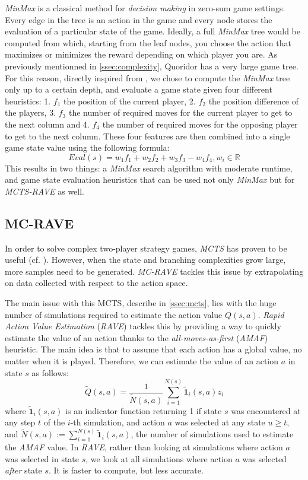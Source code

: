\documentclass[journal, a4paper]{IEEEtran}
\begin{document}
\textit{MinMax} is a classical method for \textit{decision making} in zero-sum game settings. Every edge in the tree is an action in the game and every node stores the evaluation of a particular state of the game.
Ideally, a full \textit{MinMax} tree would be computed from which, starting from the leaf nodes, you choose the action that maximizes or minimizes the reward depending on which player you are. As previously mentionned in \ref{ssec:complexity}, Quoridor has a very large game tree. For this reason, directly inspired from \cite{heuristic-agent}, we chose to compute the \textit{MinMax} tree only up to a certain depth, and evaluate a game state given four different heuristics: 1. $f_1$ the position of the current player, 2. $f_2$ the position difference of the players, 3. $f_3$ the number of required moves for the current player to get to the next column and 4. $f_4$ the number of required moves for the opposing player to get to the next column. These four features are then combined into a single game state value using the following formula:  
$$Eval(s) = w_1 f_1 + w_2 f_2 + w_3 f_3 - w_4 f_4,   w_i \in \mathbb{R}$$
This results in two things: a \textit{MinMax} search algorithm with moderate runtime, and game state evaluation heuristics that can be used not only \textit{MinMax} but for \textit{MCTS-RAVE} as well.

\subsection{MC-RAVE}
\label{ssec:mc-rave}
In order to solve complex two-player strategy games, \textit{MCTS} has proven to be useful (cf. \cite{mcts-review}). However, when the state and branching complexities grow large, more samples need to be generated. \textit{MC-RAVE}\cite{mc-rave} tackles this issue by extrapolating on data collected with respect to the action space.

The main issue with this MCTS, describe in \ref{ssec:mcts}, lies with the huge number of simulations required to estimate the action value $Q(s,a)$. \textit{Rapid Action Value Estimation} (\textit{RAVE}) \cite{mc-rave} tackles this by providing a way to quickly estimate the value of an action thanks to the \textit{all-moves-as-first} (\textit{AMAF}) heuristic. The main idea is that to assume that each action has a global value, no matter when it is played. Therefore, we can estimate the value of an action $a$ in state $s$ as follows:
$$\tilde Q(s,a) = \frac{1}{\tilde N(s,a)} \sum_{i=1}^{N(s)} \mathbf{\tilde 1}_{i}(s,a)z_i$$
where $\mathbf{\tilde 1}_{i}(s,a)$ is an indicator function returning 1 if state $s$ was encountered at any step $t$ of the $i$-th simulation, and action $a$ was selected at any state $u\geq t$, and $\tilde N(s,a):=\sum_{i=1}^{N(s)} \mathbf{\tilde 1}_{i}(s,a)$, the number of simulations used to estimate the \textit{AMAF} value. In \textit{RAVE}, rather than looking at simulations where action $a$ was selected in state $s$, we look at all simulations where action $a$ was selected \textit{after} state $s$. It is faster to compute, but less accurate.
\end{document}
